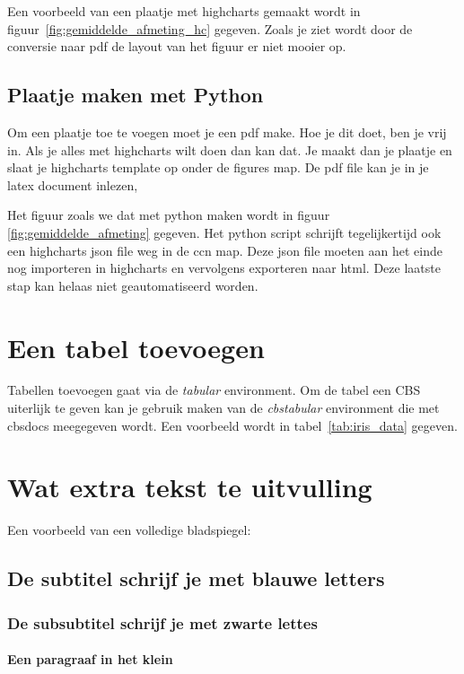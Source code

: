 

Een voorbeeld van een plaatje met highcharts gemaakt wordt in
figuur~\ref{fig:gemiddelde_afmeting_hc} gegeven.
Zoals je ziet wordt door de conversie naar pdf de layout van het figuur er niet mooier op.

\subsection{Plaatje maken met Python}
\label{subsec:plaatje_python}

Om een plaatje toe te voegen moet je een pdf make.
Hoe je dit doet, ben je vrij in.
Als je alles met highcharts wilt doen dan kan dat.
Je maakt dan je plaatje en slaat je highcharts template op onder de figures map.
De pdf file kan je in je latex document inlezen,



Het figuur zoals we dat met python maken wordt in figuur \ref{fig:gemiddelde_afmeting} gegeven.
Het python script schrijft tegelijkertijd ook een highcharts json file weg in de ccn map.
Deze json file moeten aan het einde nog importeren in highcharts en vervolgens exporteren naar
html.
Deze laatste stap kan helaas niet geautomatiseerd worden.

\section{Een tabel toevoegen}
\label{sec:tabel}

Tabellen toevoegen gaat via de \emph{tabular} environment.
Om de tabel een CBS uiterlijk te geven kan je gebruik maken van de \emph{cbstabular} environment
die met cbsdocs meegegeven wordt.
Een voorbeeld wordt in tabel~\ref{tab:iris_data} gegeven.

\blindtext[1]



\section{Wat extra tekst te uitvulling}

Een voorbeeld van een volledige bladspiegel:

\blindtext[1]

\subsection{De subtitel schrijf je met blauwe letters}

\blindtext[2]

\subsubsection{De subsubtitel schrijf je met zwarte lettes}

\blindtext[2]

\paragraph{Een paragraaf in het klein}
\blindtext[1]

